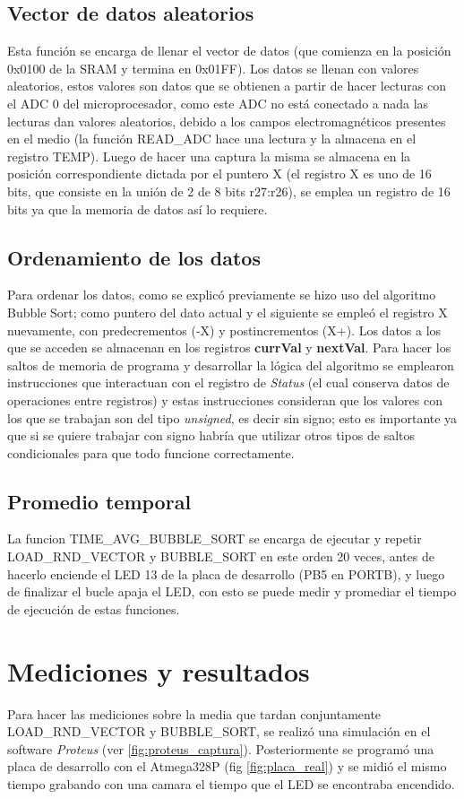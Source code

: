 \documentclass[letterpaper, 10 pt, conference]{ieeeconf}  %
\begin{document}
\subsection{Vector de datos aleatorios}
Esta función se encarga de llenar el vector de datos (que comienza en la posición 0x0100 de la SRAM y termina en 0x01FF). Los datos se llenan con valores aleatorios, estos valores son datos que se obtienen a partir de hacer lecturas con el ADC 0 del microprocesador, como este ADC no está conectado a nada las lecturas dan valores aleatorios, debido a los campos electromagnéticos presentes en el medio (la función READ\_ADC hace una lectura y la almacena en el registro TEMP). Luego de hacer una captura la misma se almacena en la posición correspondiente dictada por el puntero X (el registro X es uno de 16 bits, que consiste en la unión de 2 de 8 bits r27:r26), se emplea un registro de 16 bits ya que la memoria de datos así lo requiere.

\subsection{Ordenamiento de los datos}
Para ordenar los datos, como se explicó previamente se hizo uso del algoritmo Bubble Sort; como puntero del dato actual y el siguiente se empleó el registro X nuevamente, con predecrementos (-X) y postincrementos (X+). Los datos a los que se acceden se almacenan en los registros \textbf{currVal} y \textbf{nextVal}. Para hacer los saltos de memoria de programa y desarrollar la lógica del algoritmo se emplearon instrucciones que interactuan con el registro de \textit{Status} (el cual conserva datos de operaciones entre registros) y estas instrucciones consideran que los valores con los que se trabajan son del tipo \textit{unsigned}, es decir sin signo; esto es importante ya que si se quiere trabajar con signo habría que utilizar otros tipos de saltos condicionales para que todo funcione correctamente.

\subsection{Promedio temporal}
La funcion TIME\_AVG\_BUBBLE\_SORT se encarga de ejecutar y repetir LOAD\_RND\_VECTOR y BUBBLE\_SORT en este orden 20 veces, antes de hacerlo enciende el LED 13 de la placa de desarrollo (PB5 en PORTB), y luego de finalizar el bucle apaja el LED, con esto se puede medir y promediar el tiempo de ejecución de estas funciones.

\section{Mediciones y resultados}
Para hacer las mediciones sobre la media que tardan conjuntamente LOAD\_RND\_VECTOR y BUBBLE\_SORT, se realizó una simulación en el software \textit{Proteus} (ver \ref{fig:proteus_captura}). Posteriormente se programó una placa de desarrollo con el Atmega328P (fig \ref{fig:placa_real}) y se midió el mismo tiempo grabando con una camara el tiempo que el LED se encontraba encendido.
\end{document}
